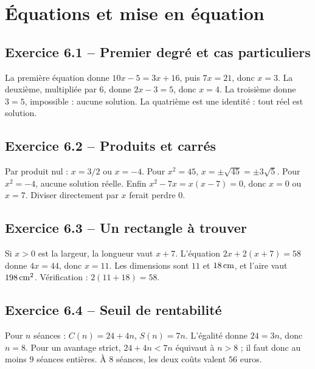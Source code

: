 \chapter{Équations et mise en équation}
\label{corriges:06}
\section*{Exercice 6.1 -- Premier degré et cas particuliers}
La première équation donne $10x-5=3x+16$, puis $7x=21$, donc $x=3$.
La deuxième, multipliée par $6$, donne $2x-3=5$, donc $x=4$.
La troisième donne $3=5$, impossible : aucune solution.
La quatrième est une identité : tout réel est solution.

\section*{Exercice 6.2 -- Produits et carrés}
Par produit nul : $x=3/2$ ou $x=-4$.
Pour $x^2=45$, $x=\pm\sqrt{45}=\pm3\sqrt5$.
Pour $x^2=-4$, aucune solution réelle.
Enfin $x^2-7x=x(x-7)=0$, donc $x=0$ ou $x=7$. Diviser directement par $x$ ferait perdre $0$.

\section*{Exercice 6.3 -- Un rectangle à trouver}
Si $x>0$ est la largeur, la longueur vaut $x+7$. L'équation $2x+2(x+7)=58$ donne $4x=44$, donc $x=11$. Les dimensions sont $11$ et $18\,\mathrm{cm}$, et l'aire vaut $198\,\mathrm{cm^2}$. Vérification : $2(11+18)=58$.

\section*{Exercice 6.4 -- Seuil de rentabilité}
Pour $n$ séances : $C(n)=24+4n$, $S(n)=7n$. L'égalité donne $24=3n$, donc $n=8$. Pour un avantage strict, $24+4n<7n$ équivaut à $n>8$ ; il faut donc au moins $9$ séances entières. À $8$ séances, les deux coûts valent $56$ euros.
